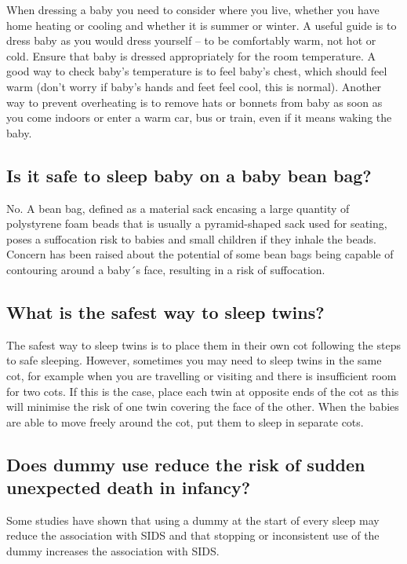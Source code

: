When dressing a baby you need to consider where you live, whether you have home heating
or cooling and whether it is summer or winter. A useful guide is to dress baby as you would
dress yourself – to be comfortably warm, not hot or cold. Ensure that baby is dressed appropriately 
for the room temperature. A good way to check baby’s temperature is to feel baby’s chest, which 
should feel warm (don’t worry if baby’s hands and feet feel cool, this is normal). Another way to 
prevent overheating is to remove hats or bonnets from baby as soon as you come indoors or enter a  
warm car, bus or train, even if it means waking the baby.

\subsection{Is it safe to sleep baby on a baby bean bag?}
No. A bean bag, defined as a material sack encasing a large quantity of polystyrene foam beads that 
is usually a pyramid-shaped sack used for seating, poses a suffocation risk to babies and small 
children if they inhale the beads.  Concern has been raised about the potential of some bean bags
being capable of contouring around a baby´s face, resulting in a risk
of suffocation.
 
\subsection{What is the safest way to sleep twins?}
The safest way to sleep twins is to place them in their own cot following the steps to safe sleeping. 
However, sometimes you may need to sleep twins in the same cot, for example when you
are travelling or visiting and there is insufficient room for two cots. If this is the case, place each
twin at opposite ends of the cot as this will minimise the risk of one twin covering the face of the 
other. When the babies are able to move freely around the cot, put
them to sleep in separate cots.

\subsection{Does dummy use reduce the risk of sudden unexpected death in infancy?}
Some studies have shown that using a dummy at the start of every sleep may reduce the association 
with SIDS and that stopping or inconsistent use of the dummy increases the association with SIDS.

